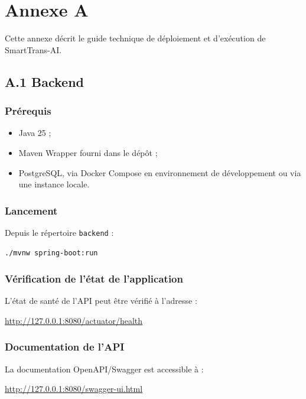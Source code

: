 \chapter*{Annexe A}

\noindent Cette annexe décrit le guide technique de déploiement et d'exécution de SmartTrans-AI.

\section*{A.1 Backend}

\subsection*{Prérequis}

\begin{itemize}
  \item Java 25 ;
  \item Maven Wrapper fourni dans le dépôt ;
  \item PostgreSQL, via Docker Compose en environnement de développement ou via une instance locale.
\end{itemize}

\subsection*{Lancement}

Depuis le répertoire \texttt{backend} :

\begin{verbatim}
./mvnw spring-boot:run
\end{verbatim}

\subsection*{Vérification de l'état de l'application}

L'état de santé de l'API peut être vérifié à l'adresse :

\url{http://127.0.0.1:8080/actuator/health}

\subsection*{Documentation de l'API}

La documentation OpenAPI/Swagger est accessible à :

\url{http://127.0.0.1:8080/swagger-ui.html}

